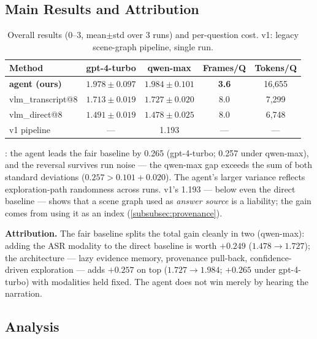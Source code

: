 \subsection{Main Results and Attribution}
\label{subsec:exp-main}

\begin{table}[t]
  \centering
  \footnotesize
  \caption{Overall results (0--3, mean$\pm$std over 3 runs) and per-question cost.
  v1: legacy scene-graph pipeline, single run.}
  \label{tab:main}
  \setlength{\tabcolsep}{2pt}
  \begin{tabular}{@{}lcccc@{}}
    \toprule
    Method & gpt-4-turbo & qwen-max & Frames/Q & Tokens/Q \\
    \midrule
    \textbf{agent (ours)} & $\mathbf{1.978{\pm}0.097}$ & $\mathbf{1.984{\pm}0.101}$ & \textbf{3.6} & 16{,}655 \\
    vlm\_transcript@8 & $1.713{\pm}0.019$ & $1.727{\pm}0.020$ & 8.0 & 7{,}299 \\
    vlm\_direct@8 & $1.491{\pm}0.019$ & $1.478{\pm}0.025$ & 8.0 & 6{,}748 \\
    v1 pipeline & --- & 1.193 & --- & --- \\
    \bottomrule
  \end{tabular}
\end{table}

: the agent leads the fair baseline by 0.265 (gpt-4-turbo; 0.257
under qwen-max), and the reversal survives run noise --- the qwen-max gap exceeds
the sum of both standard deviations ($0.257 > 0.101 + 0.020$). The agent's larger
variance reflects exploration-path randomness across runs. v1's 1.193 --- below
even the direct baseline --- shows that a scene graph used as \emph{answer source}
is a liability; the gain comes from using it as an index
(\cref{subsubsec:provenance}).

\textbf{Attribution.} The fair baseline splits the total gain cleanly in two
(qwen-max): adding the ASR modality to the direct baseline is worth $+0.249$
($1.478 \to 1.727$); the architecture --- lazy evidence memory, provenance
pull-back, confidence-driven exploration --- adds $+0.257$ on top
($1.727 \to 1.984$; $+0.265$ under gpt-4-turbo) with modalities held fixed. The
agent does not win merely by hearing the narration.

\subsection{Analysis}
\label{subsec:exp-analysis}

